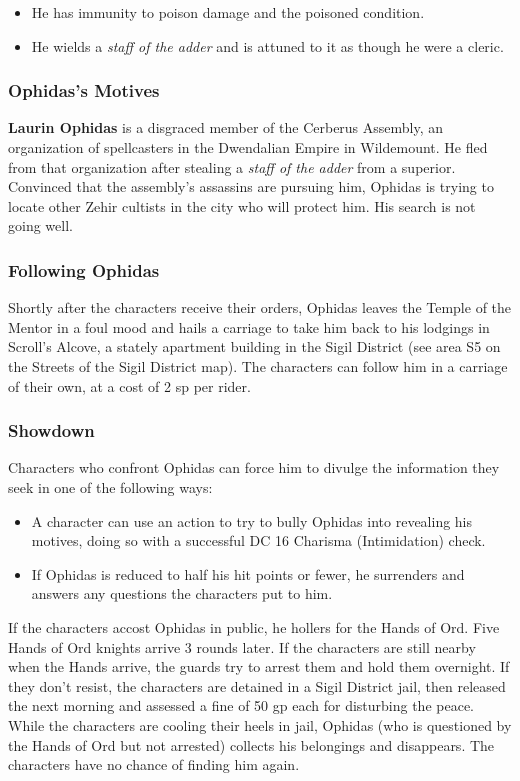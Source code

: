 \documentclass[10pt,a4paper,twoside,bg=print,twocolumn,openany,nodeprecatedcode]{dndbook}
\begin{document}
\begin{itemize}
\item He has immunity to poison damage and the poisoned condition.
\item He wields a \textit{staff of the adder} and is attuned to it as though he were a cleric.
\end{itemize}

\subsubsection{Ophidas's Motives}
\textbf{Laurin Ophidas} is a disgraced member of the Cerberus Assembly, an organization of spellcasters in the Dwendalian Empire in Wildemount. He fled from that organization after stealing a \textit{staff of the adder} from a superior. Convinced that the assembly's assassins are pursuing him, Ophidas is trying to locate other Zehir cultists in the city who will protect him. His search is not going well.

\subsubsection{Following Ophidas}
Shortly after the characters receive their orders, Ophidas leaves the Temple of the Mentor in a foul mood and hails a carriage to take him back to his lodgings in Scroll's Alcove, a stately apartment building in the Sigil District (see area S5 on the Streets of the Sigil District map). The characters can follow him in a carriage of their own, at a cost of 2 sp per rider.

\subsubsection{Showdown}
Characters who confront Ophidas can force him to divulge the information they seek in one of the following ways:


\begin{itemize}
\item A character can use an action to try to bully Ophidas into revealing his motives, doing so with a successful DC 16 Charisma (Intimidation) check.
\item If Ophidas is reduced to half his hit points or fewer, he surrenders and answers any questions the characters put to him.
\end{itemize}

If the characters accost Ophidas in public, he hollers for the Hands of Ord. Five Hands of Ord knights arrive 3 rounds later. If the characters are still nearby when the Hands arrive, the guards try to arrest them and hold them overnight. If they don't resist, the characters are detained in a Sigil District jail, then released the next morning and assessed a fine of 50 gp each for disturbing the peace. While the characters are cooling their heels in jail, Ophidas (who is questioned by the Hands of Ord but not arrested) collects his belongings and disappears. The characters have no chance of finding him again.
\end{document}
